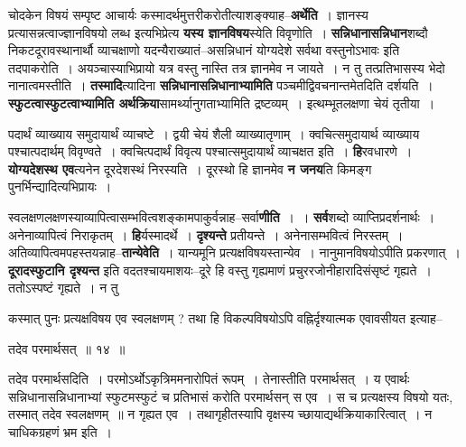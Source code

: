 \documentclass[article,12pt,a4paper]{memoir}
\begin{document}
	  \pstart चोदकेन विषयं सम्पृष्ट आचार्यः कस्मादर्थमुत्तरीकरोतीत्याशङ्क्याह--\textbf{अर्थेति} । ज्ञानस्य प्रत्यासन्नत्वाज्ज्ञानविषयो लब्ध इत्यभिप्रेत्य \textbf{यस्य ज्ञानविषय}स्येति विवृणोति । \textbf{सन्निधानासन्निधान}शब्दौ निकटदूरावस्थानार्थौ व्याचक्षाणो यदन्यैराख्यातं--असन्निधानं योग्यदेशे सर्वथा वस्तुनोऽभावः इति तदपाकरोति । अयञ्चास्याभिप्रायो यत्र वस्तु नास्ति तत्र ज्ञानमेव न जायते । न तु तत्प्रतिभासस्य भेदो नानात्वमस्तीति । \textbf{तस्मादि}त्यादिना \textbf{स}\leavevmode{}\textbf{न्निधानासन्निधानाभ्यामिति} पञ्चमीद्विवचनान्तमेतदिति दर्शयति । \textbf{स्फुटत्वास्फुटत्वाभ्यामिति अर्थक्रिया}सामर्थ्यानुगताभ्यामिति द्रष्टव्यम् । इत्थम्भूतलक्षणा चेयं तृतीया ।
	\pend
      

	  \pstart पदार्थं व्याख्याय समुदायार्थं व्याचष्टे । द्वयी चेयं शैली व्याख्यातृणाम् । क्वचित्समुदायार्थ व्याख्याय पश्चात्पदार्थम् विवृण्वते । क्वचित्पदार्थं विवृत्य पश्चात्समुदायार्थं व्याचक्षत इति । \textbf{हि}रवधारणे । \textbf{योग्यदेशस्थ एव}त्यनेन दूरदेशस्थं निरस्यति । दूरस्थो हि ज्ञानमेव \textbf{न जनय}ति किमङ्ग पुनर्भिन्द्यादित्यभिप्रायः ।
	\pend
      

	  \pstart स्वलक्षणलक्षणस्याव्यापित्वासम्भवित्वशङ्कामपाकुर्वन्नाह--सर्वा\textbf{णीति} । । \textbf{सर्व}शब्दो व्याप्तिप्रदर्शनार्थः । अनेनाव्यापित्वं निराकृतम् । \textbf{हि}र्यस्मादर्थे । \textbf{दृश्यन्ते} प्रतीयन्ते । अनेनासम्भवित्वं निरस्तम् । अतिव्यापित्वमपहस्तयन्नाह--\textbf{तान्येवेति} । यान्यमूनि प्रत्यक्षविषयस्तान्येव । नानुमानविषयोऽपीति प्रकरणात् । \textbf{दूरादस्फुटानि दृश्यन्त} इति वदतश्चायमाशयः--दूरे हि वस्तु गृह्यमाणं प्रचुररजोनीहारादिसंसृष्टं गृह्यते । ततोऽस्पष्टं गृह्यते । न तु  \leavevmode{} 
	  
	कस्मात् पुनः प्रत्यक्षविषय एव स्वलक्षणम् ? तथा हि विकल्पविषयोऽपि वह्निर्दृश्यात्मक एवावसीयत इत्याह--  
	  
	तदेव परमार्थसत् ॥ १४ ॥ 
	  
	तदेव परमार्थसदिति । परमोऽर्थोऽकृत्रिममनारोपितं रूपम् । तेनास्तीति परमार्थसत् । य एवार्थः सन्निधानासन्निधानाभ्यां स्फुटमस्फुटं च प्रतिभासं करोति परमार्थसन् स एव । स च प्रत्यक्षस्य विषयो यतः, तस्मात् तदेव स्वलक्षणम् ॥ न गृह्यत एव । तथागृहीतस्यापि वृक्षस्य च्छायाद्यर्थक्रियाकारित्वात् । न चाधिकग्रहणं भ्रम इति ।
	\pend
      
\end{document}
